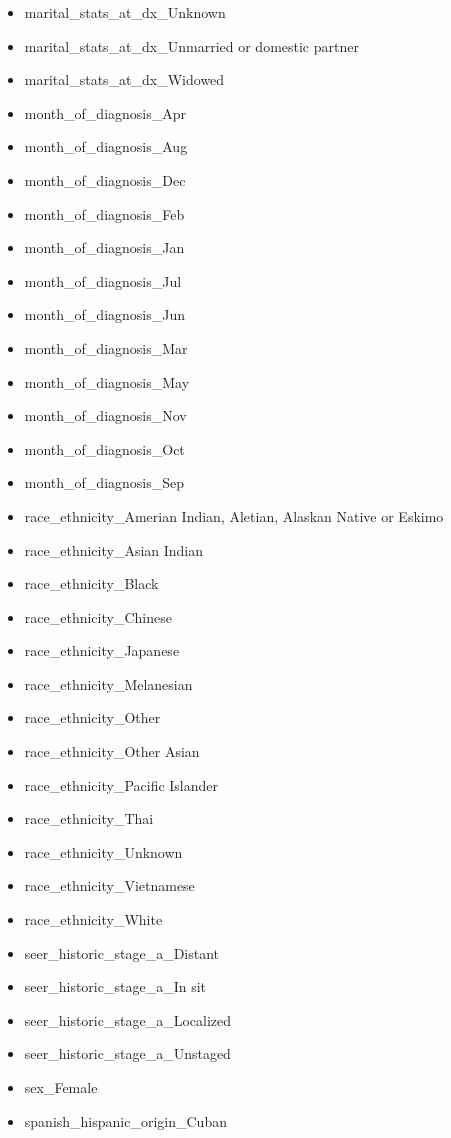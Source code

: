 \documentclass[10pt,letterpaper]{article}
\begin{document}
\begin{itemize}[noitemsep]
\item marital\_stats\_at\_dx\_Unknown
\item marital\_stats\_at\_dx\_Unmarried or domestic partner
\item marital\_stats\_at\_dx\_Widowed
\item month\_of\_diagnosis\_Apr
\item month\_of\_diagnosis\_Aug
\item month\_of\_diagnosis\_Dec
\item month\_of\_diagnosis\_Feb
\item month\_of\_diagnosis\_Jan
\item month\_of\_diagnosis\_Jul
\item month\_of\_diagnosis\_Jun
\item month\_of\_diagnosis\_Mar
\item month\_of\_diagnosis\_May
\item month\_of\_diagnosis\_Nov
\item month\_of\_diagnosis\_Oct
\item month\_of\_diagnosis\_Sep
\item race\_ethnicity\_Amerian Indian, Aletian, Alaskan Native or Eskimo
\item race\_ethnicity\_Asian Indian
\item race\_ethnicity\_Black
\item race\_ethnicity\_Chinese
\item race\_ethnicity\_Japanese
\item race\_ethnicity\_Melanesian
\item race\_ethnicity\_Other
\item race\_ethnicity\_Other Asian
\item race\_ethnicity\_Pacific Islander
\item race\_ethnicity\_Thai
\item race\_ethnicity\_Unknown
\item race\_ethnicity\_Vietnamese
\item race\_ethnicity\_White
\item seer\_historic\_stage\_a\_Distant
\item seer\_historic\_stage\_a\_In sit
\item seer\_historic\_stage\_a\_Localized
\item seer\_historic\_stage\_a\_Unstaged
\item sex\_Female
\item spanish\_hispanic\_origin\_Cuban

\end{itemize}
\end{document}
